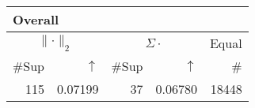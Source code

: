 \begin{center}
\renewcommand{\tabcolsep}{4pt}
\renewcommand{\arraystretch}{1.1}
\begin{customnormal}
\begin{tabular}{rrrrr}
\multicolumn{5}{l}{Overall}\\
\toprule
\multicolumn{2}{c}{$\lVert \cdot \rVert_2$} & \multicolumn{2}{c}{$\Sigma \cdot$} & \multicolumn{1}{c}{Equal} \\ 
\cmidrule(lr){1-2} \cmidrule(lr){3-4} \cmidrule(lr){5-5}
\#Sup & $\uparrow$ & \#Sup & $\uparrow$ & \# \\ 
\midrule
115 & 0.07199  & 37 & 0.06780  & 18448 \\ 
\bottomrule
\end{tabular}


\end{customnormal}
\end{center}



